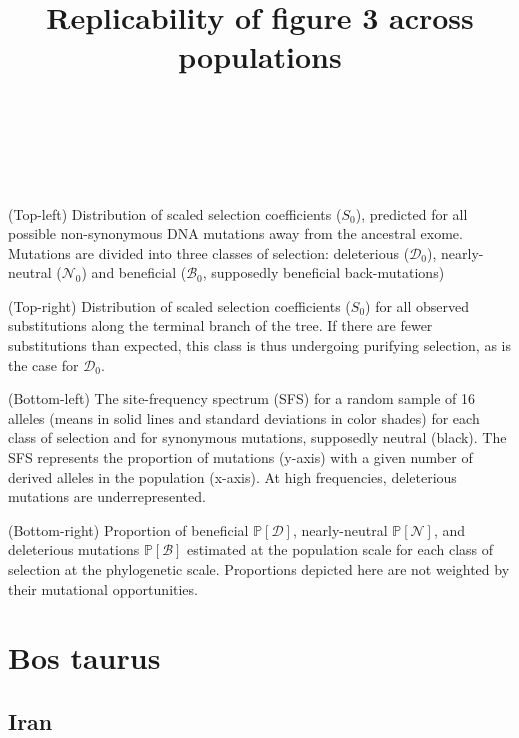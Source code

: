 \documentclass{article}
\title{Replicability of figure 3 across populations}
\date{~}
\author{~}
\newcommand{\proba}{\mathbb{P}}
\newcommand{\Sphy}{S_{0}}
\newcommand{\SphyDel}{\mathcal{D}_0}
\newcommand{\SphyNeu}{\mathcal{N}_0}
\newcommand{\SphyBen}{\mathcal{B}_0}
\newcommand{\SpopDel}{\mathcal{D}}
\newcommand{\SpopNeu}{\mathcal{N}}
\newcommand{\SpopBen}{\mathcal{B}}
\newcommand{\ProbaPopDel}{\proba [ \SpopDel]}
\newcommand{\ProbaPopNeu}{\proba [ \SpopNeu ]}
\newcommand{\ProbaPopBen}{\proba [ \SpopBen ]}
\begin{document}
    \maketitle
    \tableofcontents

    \newpage

    (Top-left) Distribution of scaled selection coefficients ($\Sphy$), predicted for all possible non-synonymous DNA mutations away from the ancestral exome.
    Mutations are divided into three classes of selection: deleterious ($\SphyDel$), nearly-neutral ($\SphyNeu$) and beneficial ($\SphyBen$, supposedly beneficial back-mutations)

    (Top-right) Distribution of scaled selection coefficients ($\Sphy$) for all observed substitutions along the terminal branch of the tree.
    If there are fewer substitutions than expected, this class is thus undergoing purifying selection, as is the case for $\SphyDel$.

    (Bottom-left) The site-frequency spectrum (SFS) for a random sample of 16 alleles (means in solid lines and standard deviations in color shades) for each class of selection and for synonymous mutations, supposedly neutral (black).
    The SFS represents the proportion of mutations (y-axis) with a given number of derived alleles in the population (x-axis).
    At high frequencies, deleterious mutations are underrepresented.

    (Bottom-right) Proportion of beneficial $\ProbaPopDel$, nearly-neutral $\ProbaPopNeu$, and deleterious mutations $\ProbaPopBen$ estimated at the population scale for each class of selection at the phylogenetic scale.
    Proportions depicted here are not weighted by their mutational opportunities.
    \section{Bos taurus}

    \subsection{Iran}
\end{document}
